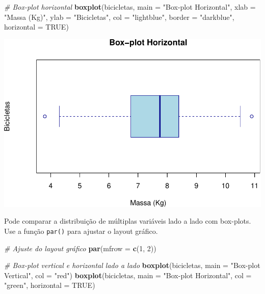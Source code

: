 \documentclass[
]{book}
\newenvironment{Shaded}{\begin{snugshade}}{\end{snugshade}}
\newcommand{\AttributeTok}[1]{\textcolor[rgb]{0.13,0.29,0.53}{#1}}
\newcommand{\CommentTok}[1]{\textcolor[rgb]{0.56,0.35,0.01}{\textit{#1}}}
\newcommand{\ConstantTok}[1]{\textcolor[rgb]{0.56,0.35,0.01}{#1}}
\newcommand{\DecValTok}[1]{\textcolor[rgb]{0.00,0.00,0.81}{#1}}
\newcommand{\FunctionTok}[1]{\textcolor[rgb]{0.13,0.29,0.53}{\textbf{#1}}}
\newcommand{\NormalTok}[1]{#1}
\newcommand{\StringTok}[1]{\textcolor[rgb]{0.31,0.60,0.02}{#1}}
\begin{document}
\begin{Shaded}
\begin{Highlighting}[]
\CommentTok{\# Box{-}plot horizontal}
\FunctionTok{boxplot}\NormalTok{(bicicletas, }
        \AttributeTok{main =} \StringTok{"Box{-}plot Horizontal"}\NormalTok{,}
        \AttributeTok{xlab =} \StringTok{"Massa (Kg)"}\NormalTok{,}
        \AttributeTok{ylab =} \StringTok{"Bicicletas"}\NormalTok{,}
        \AttributeTok{col =} \StringTok{"lightblue"}\NormalTok{,}
        \AttributeTok{border =} \StringTok{"darkblue"}\NormalTok{,}
        \AttributeTok{horizontal =} \ConstantTok{TRUE}\NormalTok{)}
\end{Highlighting}
\end{Shaded}

\includegraphics{introR_files/figure-latex/unnamed-chunk-175-1.pdf}

Pode comparar a distribuição de múltiplas variáveis lado a lado com
box-plots. Use a função \texttt{par()} para ajustar o layout gráfico.

\begin{Shaded}
\begin{Highlighting}[]
\CommentTok{\# Ajuste do layout gráfico}
\FunctionTok{par}\NormalTok{(}\AttributeTok{mfrow =} \FunctionTok{c}\NormalTok{(}\DecValTok{1}\NormalTok{, }\DecValTok{2}\NormalTok{))}

\CommentTok{\# Box{-}plot vertical e horizontal lado a lado}
\FunctionTok{boxplot}\NormalTok{(bicicletas, }\AttributeTok{main =} \StringTok{"Box{-}plot Vertical"}\NormalTok{, }\AttributeTok{col =} \StringTok{"red"}\NormalTok{)}
\FunctionTok{boxplot}\NormalTok{(bicicletas, }\AttributeTok{main =} \StringTok{"Box{-}plot Horizontal"}\NormalTok{, }\AttributeTok{col =} \StringTok{"green"}\NormalTok{, }\AttributeTok{horizontal =} \ConstantTok{TRUE}\NormalTok{)}
\end{Highlighting}
\end{Shaded}
\end{document}
